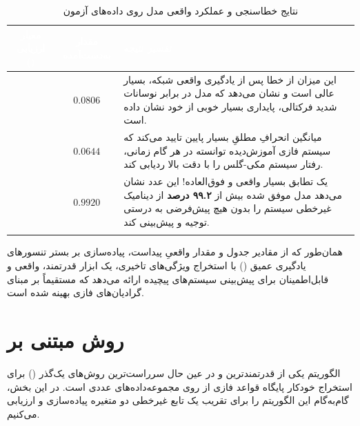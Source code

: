 \documentclass{article}
\begin{document}
\vspace{0.5cm}

\begin{table}[H]
	\centering
	\renewcommand{\arraystretch}{1.6}
	\begin{tabular}{!{\vrule width 1pt}c|c|p{8cm}!{\vrule width 1pt}} 
		\textcolor{white}{\textbf{معیار ارزیابی ()}} & \textcolor{white}{\textbf{مقدار به‌دست‌آمده}} & \textcolor{white}{\centering \textbf{تفسیر نتیجه}} \\
		\hline
		 & $\mathbf{0.0806}$ & این میزان از خطا پس از یادگیری واقعی شبکه، بسیار عالی است و نشان می‌دهد که مدل در برابر نوسانات شدید فرکتالی، پایداری بسیار خوبی از خود نشان داده است. \\
		\hline
		 & $\mathbf{0.0644}$ & میانگین انحرافِ مطلقِ بسیار پایین تایید می‌کند که سیستم فازی آموزش‌دیده توانسته در هر گام زمانی، رفتار سیستم مکی-گلس را با دقت بالا ردیابی کند. \\
		\hline
		 & $\mathbf{0.9920}$ & یک تطابق بسیار واقعی و فوق‌العاده! این عدد نشان می‌دهد مدل  موفق شده بیش از \textbf{۹۹.۲ درصد} از دینامیک غیرخطی سیستم را بدون هیچ پیش‌فرضی به درستی توجیه و پیش‌بینی کند. \\
	\end{tabular}
	\caption{نتایج خطاسنجی و عملکرد واقعی مدل  روی داده‌های آزمون}
\end{table}

همان‌طور که از مقادیر جدول و مقدار واقعیِ  پیداست، پیاده‌سازی  بر بستر تنسورهای یادگیری عمیق () با استخراج ویژگی‌های تاخیری، یک ابزار قدرتمند، واقعی و قابل‌اطمینان برای پیش‌بینی سیستم‌های پیچیده ارائه می‌دهد که مستقیماً بر مبنای گرادیان‌های فازی بهینه شده است.

\section{روش  مبتنی بر }

الگوریتم  یکی از قدرتمندترین و در عین حال سرراست‌ترین روش‌های یک‌گذر () برای استخراج خودکار پایگاه قواعد فازی از روی مجموعه‌داده‌های عددی است. در این بخش، گام‌به‌گام این الگوریتم را برای تقریب یک تابع غیرخطی دو متغیره پیاده‌سازی و ارزیابی می‌کنیم.

\end{document}
